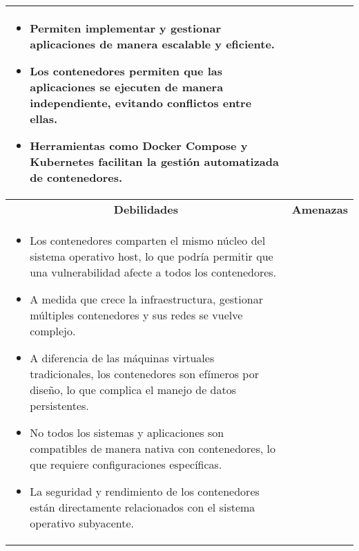 \begin{table}[H]
\begin{tabularx}{\textwidth}{|X|X|}
\begin{minipage}[t]{\dimexpr\linewidth-8mm}
\begin{itemize}
    \item \hspace{5mm} Permiten implementar y gestionar aplicaciones de manera escalable y eficiente.
    \item \hspace{5mm} Los contenedores permiten que las aplicaciones se ejecuten de manera independiente, evitando conflictos entre ellas.
    \item \hspace{5mm} Herramientas como Docker Compose y Kubernetes facilitan la gestión automatizada de contenedores.
\end{itemize}
\vspace{2pt}
\end{minipage}
\hspace{4mm} %
\\
\hline
\multicolumn{1}{|c|}{\textbf{Debilidades}} & \multicolumn{1}{c|}{\textbf{Amenazas}} \\
\hline
\begin{minipage}[t]{\dimexpr\linewidth-8mm} %
\vspace{2pt}
\begin{itemize}
    \setlength\itemsep{0pt}
    \setlength\parskip{0pt}
    \setlength\parsep{0pt}
    \item \hspace{5mm} Los contenedores comparten el mismo núcleo del sistema operativo host, lo que podría permitir que una vulnerabilidad afecte a todos los contenedores.
    \item \hspace{5mm} A medida que crece la infraestructura, gestionar múltiples contenedores y sus redes se vuelve complejo.
    \item \hspace{5mm} A diferencia de las máquinas virtuales tradicionales, los contenedores son efímeros por diseño, lo que complica el manejo de datos persistentes.
    \item \hspace{5mm} No todos los sistemas y aplicaciones son compatibles de manera nativa con contenedores, lo que requiere configuraciones específicas.
    \item \hspace{5mm} La seguridad y rendimiento de los contenedores están directamente relacionados con el sistema operativo subyacente.
\end{itemize}
\vspace{2pt}
\end{minipage}

\end{tabularx}
\end{table}
